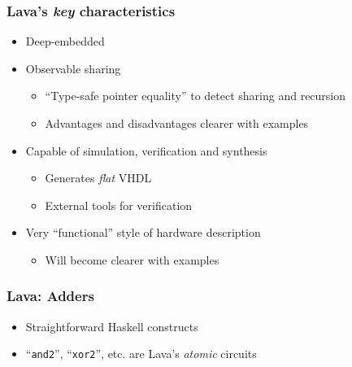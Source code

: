         \begin{frame}
            \frametitle{Lava's \emph{key} characteristics}

            \begin{itemize}
                \item Deep-embedded
                \item Observable sharing
                    \begin{itemize}
                        \item ``Type-safe pointer equality'' to detect sharing and recursion
                        \item Advantages and disadvantages clearer with examples
                    \end{itemize}
                \item Capable of simulation, verification and synthesis
                    \begin{itemize}
                        \item Generates \emph{flat} VHDL
                        \item External tools for verification
                    \end{itemize}
                \item Very ``functional'' style of hardware description
                    \begin{itemize}
                        \item Will become clearer with examples
                    \end{itemize}
            \end{itemize}
        \end{frame}

        \begin{frame}
            \frametitle{Lava: Adders}

            \begin{itemize}
                \item Straightforward Haskell constructs
                \item ``\texttt{and2}'', ``\texttt{xor2}'', etc. are Lava's \emph{atomic} circuits
            \end{itemize}
        \end{frame}

